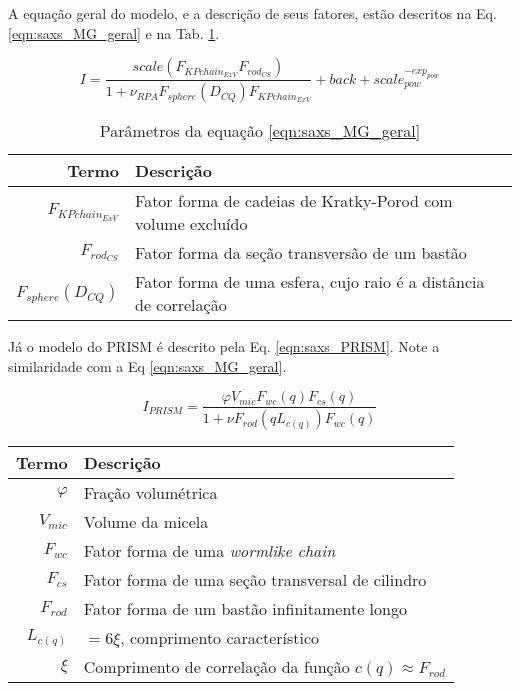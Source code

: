\begin{apendicesenv}
	A equação geral do modelo, e a descrição de seus fatores, estão descritos na Eq.\ref{eqn:saxs_MG_geral} e na Tab. \ref{tab_ap:fatores_geral}.
	
	\begin{equation}
	I = \frac{scale\left(F_{KPchain_{ExV}}F_{rod_{CS}}\right)}{1 + \nu_{RPA} F_{sphere}\left( D_{CQ}\right) F_{KPchain_{ExV}}} + back + scale_{pow}^{-exp_{pow}}
	\label{eqn:saxs_MG_geral}
	\end{equation}
	
    \begin{table}
        \IBGEtab%
        {\caption{Parâmetros da equação \ref{eqn:saxs_MG_geral}}
         \label{tab_ap:fatores_geral} }%
        {\begin{tabular}{r p{8cm}}
        \toprule
        Termo 			& Descrição        						\\
        \midrule
        $F_{KPchain_{ExV}}$  & Fator forma de cadeias de Kratky-Porod com volume excluído \\
        $F_{rod_{CS}}$		 & Fator forma da seção transversão de um bastão	\\
        $F_{sphere}(D_{CQ})$ & Fator forma de uma esfera, cujo raio é a distância de correlação \\
        \bottomrule%
        \end{tabular}}
        {}%
    \end{table}
    
	
	Já o modelo do PRISM é descrito pela Eq. \ref{eqn:saxs_PRISM}. Note a similaridade com a Eq \ref{eqn:saxs_MG_geral}.
	
	\begin{equation}
	I_{PRISM}= \frac{\varphi V_{mic}F_{wc}(q)F_{cs}(q)}{1 + \nu F_{rod}(qL_{c(q)})F_{wc}(q)}
	\label{eqn:saxs_PRISM}
	\end{equation}
	
    \begin{table}
        {%
         \begin{tabular}{r p{8cm}}
         \toprule
         Termo 			& Descrição        						\\
         \midrule
         $\varphi$		& Fração volumétrica \\ %
         $V_{mic}$		& Volume da micela   \\
         $F_{wc}$		& Fator forma de uma \emph{wormlike chain} \\
         $F_{cs}$		& Fator forma de uma seção transversal de cilindro \\ %
         $F_{rod}$		& Fator forma de um bastão infinitamente longo \\
         $L_{c(q)}$		& $=6\xi$, comprimento característico \\
         $\xi$			& Comprimento de correlação da função $c(q) \approx F_{rod}$ \\
         \bottomrule
         \end{tabular}}%
         {}%
    \end{table}
   

\end{apendicesenv}
